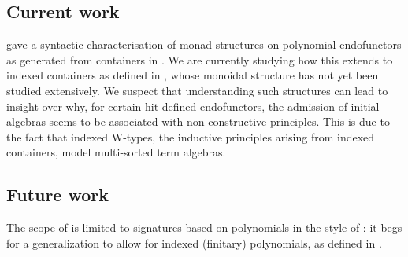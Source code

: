 \documentclass[a4paper]{article}
\begin{document}
\subsection{Current work}



\textcite{Uustalu2017} gave a syntactic characterisation of monad structures on polynomial endofunctors as generated from containers in \cite{Abbott2005}. We are currently studying how this extends to indexed containers as defined in \cite{Altenkirch2015}, whose monoidal structure has not yet been studied extensively. We suspect that understanding such structures can lead to insight over why, for certain \gls{hit}-defined endofunctors, the admission of initial algebras seems to be associated with non-constructive principles. This is due to the fact that indexed W-types, the inductive principles arising from indexed containers, model multi-sorted term algebras.

\subsection{Future work}

The scope of \cite{Weide2019} is limited to signatures based on polynomials in the style of \cite{Goldblatt2001}: it begs for a generalization to allow for indexed (finitary) polynomials, as defined in \cite{Altenkirch2015}.

\printacronyms
\printbibliography
\end{document}
